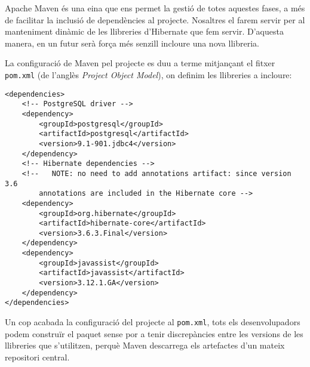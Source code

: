 Apache Maven és una eina que ens permet la gestió de totes aquestes fases, a més de facilitar la inclusió de dependències al projecte. Nosaltres el farem servir per al manteniment dinàmic de les llibreries d'Hibernate que fem servir. D'aquesta manera, en un futur serà força més senzill incloure una nova llibreria.

La configuració de Maven pel projecte es duu a terme mitjançant el fitxer \texttt{pom.xml} (de l'anglès \emph{Project Object Model}), on definim les llibreries a incloure:

\begin{verbatim}
<dependencies>
 	<!-- PostgreSQL driver -->
 	<dependency>
  		<groupId>postgresql</groupId>
  		<artifactId>postgresql</artifactId>
  		<version>9.1-901.jdbc4</version>
	</dependency>
 	<!-- Hibernate dependencies -->
 	<!--   NOTE: no need to add annotations artifact: since version 3.6
        annotations are included in the Hibernate core -->
	<dependency>
		<groupId>org.hibernate</groupId>
		<artifactId>hibernate-core</artifactId>
		<version>3.6.3.Final</version>
	</dependency>
	<dependency>
		<groupId>javassist</groupId>
		<artifactId>javassist</artifactId>
		<version>3.12.1.GA</version>
	</dependency>
</dependencies>
\end{verbatim}

Un cop acabada la configuració del projecte al \texttt{pom.xml}, tots els desenvolupadors podem construïr el paquet sense por a tenir discrepàncies entre les versions de les llibreries que s'utilitzen, perquè Maven descarrega els artefactes d'un mateix repositori central.